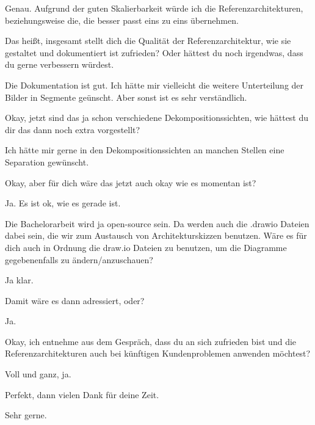 \TVL Genau. Aufgrund der guten Skalierbarkeit würde ich die Referenzarchitekturen, beziehungsweise die, die besser passt eins zu eins übernehmen.

\LF Das heißt, insgesamt stellt dich die Qualität der Referenzarchitektur, wie sie gestaltet und dokumentiert ist zufrieden? Oder hättest du noch irgendwas, dass du gerne verbessern würdest.

\TVL Die Dokumentation ist gut. Ich hätte mir vielleicht die weitere Unterteilung der Bilder in Segmente geünscht. Aber sonst ist es sehr verständlich.

\LF Okay, jetzt sind das ja schon verschiedene Dekompositionssichten, wie hättest du dir das dann noch extra vorgestellt?

\TVL Ich hätte mir gerne in den Dekompositionssichten an manchen Stellen eine Separation gewünscht.

\LF Okay, aber für dich wäre das jetzt auch okay wie es momentan ist?

\TVL Ja. Es ist ok, wie es gerade ist.

\LF Die Bachelorarbeit wird ja open-source sein. Da werden auch die .drawio Dateien dabei sein, die wir zum Austausch von Architekturskizzen benutzen. Wäre es für dich auch in Ordnung die draw.io Dateien zu benutzen, um die Diagramme gegebenenfalls zu ändern/anzuschauen?

\TVL Ja klar.

\LF Damit wäre es dann adressiert, oder?

\TVL Ja.

\LF Okay, ich entnehme aus dem Gespräch, dass du an sich zufrieden bist und die Referenzarchitekturen auch bei künftigen Kundenproblemen anwenden möchtest?

\TVL Voll und ganz, ja.

\LF Perfekt, dann vielen Dank für deine Zeit.

\TVL Sehr gerne.